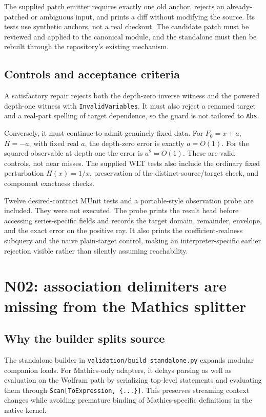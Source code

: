 \documentclass[11pt,letterpaper]{article}
\newcommand{\code}[1]{\nolinkurl{#1}}
\begin{document}
The supplied patch emitter requires exactly one old anchor, rejects an already-patched or ambiguous input, and prints a diff without modifying the source. Its tests use synthetic anchors, not a real checkout. The candidate patch must be reviewed and applied to the canonical module, and the standalone must then be rebuilt through the repository's existing mechanism.

\subsection{Controls and acceptance criteria}
A satisfactory repair rejects both the depth-zero inverse witness and the powered depth-one witness with \code{InvalidVariables}. It must also reject a renamed target and a real-part spelling of target dependence, so the guard is not tailored to \code{Abs}.

Conversely, it must continue to admit genuinely fixed data. For \(F_0=x+a\), \(H=-a\), with fixed real \(a\), the depth-zero error is exactly \(a=O(1)\). For the squared observable at depth one the error is \(a^2=O(1)\). These are valid controls, not near misses. The supplied WLT tests also include the ordinary fixed perturbation \(H(x)=1/x\), preservation of the distinct-source/target check, and component exactness checks.

Twelve desired-contract MUnit tests and a portable-style observation probe are included. They were not executed. The probe prints the result head before accessing series-specific fields and records the target domain, remainder, envelope, and the exact error on the positive ray. It also prints the coefficient-realness subquery and the naive plain-target control, making an interpreter-specific earlier rejection visible rather than silently assuming reachability.

\section{N02: association delimiters are missing from the Mathics splitter}
\label{sec:n02}

\subsection{Why the builder splits source}
The standalone builder in \code{validation/build_standalone.py} expands modular companion loads. For Mathics-only adapters, it delays parsing as well as evaluation on the Wolfram path by serializing top-level statements and evaluating them through \texttt{Scan[ToExpression, \{...\}]}. This preserves streaming context changes while avoiding premature binding of Mathics-specific definitions in the native kernel.\cite{builder}
\end{document}
